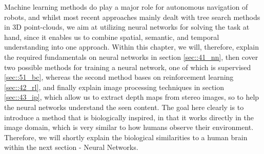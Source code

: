 \FloatBarrier
\label{sec::4_ml}
Machine learning methods do play a major role for autonomous navigation of robots, and whilst most recent approaches mainly dealt with tree search methods in 3D point-clouds, we aim at utilizing neural networks for solving the task at hand, since it enables us to combine spatial, semantic, and temporal understanding into one approach. Within this chapter, we will, therefore, explain the required fundamentals on neural networks in section \ref{sec::41_nn}, then cover two possible methods for training a neural network, one of which is supervised \ref{sec::51_bc}, whereas the second method bases on reinforcement learning \ref{sec::42_rl}, and finally explain image processing techniques in section \ref{sec::43_ip}, which allow us to extract depth maps from stereo images, so to help the neural networks understand the seen content. The goal here clearly is to introduce a method that is biologically inspired, in that it works directly in the image domain, which is very similar to how humans observe their environment. Therefore, we will shortly explain the biological similarities to a human brain within the next section - Neural Networks.